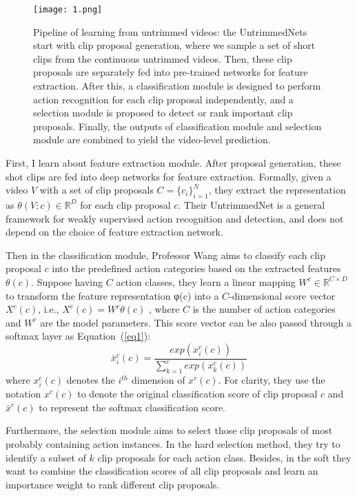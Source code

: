 \documentclass[twocolumn]{article}
\begin{document}
\begin{figure*}[htbp!] 
	\begin{center} 
		\texttt{[image: 1.png]} 
		\caption{Pipeline of learning from untrimmed videos: the UntrimmedNets start with clip proposal generation, where we sample a set of short clips from the continuous untrimmed videos. Then, these clip proposals are separately fed into pre-trained networks for feature extraction. After this, a classification module is designed to perform action recognition for each clip proposal independently, and a selection module is proposed to detect or rank important clip proposals. Finally, the outputs of classification module and selection module are combined to yield the video-level prediction.} 
	\end{center}   \label{fig:1} 
\end{figure*}
	
	First, I learn about feature extraction module. After proposal generation, these shot clips are fed into deep networks for feature extraction. Formally, given a video $V$ with a set of clip proposals $C = \{ c_i     \}_{i=1}^N$, they extract the representation as $\theta (V;c)\in \mathbb{R}^D$ for each clip proposal $c$. Their UntrimmedNet is a general framework for weakly supervised action recognition and detection, and does not depend on the choice of feature extraction network.
	
	Then in the classification module, Professor Wang aims to classify each clip proposal $c$ into the predefined action categories based on the extracted features $\theta (c) $. Suppose having $C$ action classes, they learn a linear mapping $W^c \in \mathbb{R}^{C \times D}$ to transform the feature representation φ(c) into a $C$-dimensional score vector $X^c(c)$, i.e., $X^c(c) = W^c\theta (c)$ , where $C$ is the number of action categories and $W^c$ are the model parameters. This score vector can be also passed through a softmax layer as Equation~(\ref{eq1}):
	\begin{equation}
	\bar{x}_i^c(c)=\frac{exp(x_i^c(c))}{\sum_{k=1}^{c}exp(x_k^c(c))} \label{eq1}
	\end{equation}
	where $x_i^c(c)$ denotes the $i^{th}$ dimension of $x^c(c)$. For clarity, they use the notation $x^c(c)$ to denote the original classification score of clip proposal $c$ and $\bar{x}^c(c)$ to represent the softmax classification score.
	
	Furthermore, the selection module aims to select those clip proposals of most probably containing action instances. In the hard selection method, they try to identify a subset of $k$ clip proposals for each action class. Besides, in the soft they want to combine the classification scores of all clip proposals and learn an importance weight to rank different clip proposals.
\end{document}
